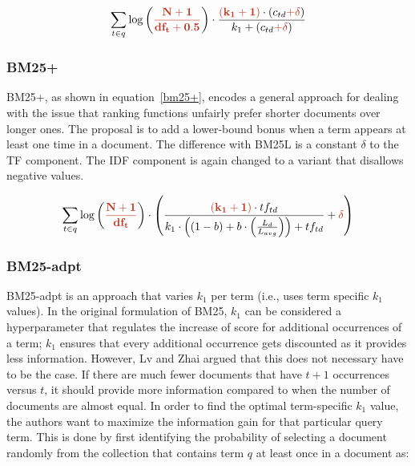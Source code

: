 \begin{equation}
	\label{bm25l}
	\sum_{t\in q} \log\left(\mathbf{\begingroup\color{ruhuisstijlrood}\frac{N+1}{df_t + 0.5}\endgroup}\right)\cdot\frac{\mathbf{\begingroup\color{ruhuisstijlrood}(k_1 + 1)\endgroup}\cdot(c_{td} \mathbf{\begingroup\color{ruhuisstijlrood}+ \delta\endgroup})}{k_1 + (c_{td} \mathbf{\begingroup\color{ruhuisstijlrood}+ \delta\endgroup})}
\end{equation}

\subsubsection{BM25+~\cite{bm25+}}
BM25+, as shown in equation~\ref{bm25+}, encodes a general approach for dealing with the issue that ranking functions unfairly prefer shorter documents over longer ones. The proposal is to add a lower-bound bonus when a term appears at least one time in a document. The difference with BM25L is a constant $\delta$ to the TF component. The IDF component is again changed to a variant that disallows negative values.

\begin{equation}
	\label{bm25+}
	\sum_{t\in q} \log\left(\mathbf{\begingroup\color{ruhuisstijlrood}\frac{N+1}{df_t}\endgroup}\right)\cdot\left(\frac{\mathbf{\begingroup\color{ruhuisstijlrood}\left(k_1 + 1\right)\endgroup}\cdot tf_{td}}{k_1\cdot\left(\left(1-b\right)+b\cdot\left(\frac{L_d}{L_{avg}}\right)\right)+tf_{td}}+\mathbf{\begingroup\color{ruhuisstijlrood}\delta\endgroup}\right)
\end{equation}

\subsubsection{BM25-adpt~\cite{bm25-adpt}}
BM25-adpt is an approach that varies $k_1$ per term (i.e., uses term specific $k_1$ values). In the original formulation of BM25, $k_1$ can be considered a hyperparameter that regulates the increase of score for additional occurrences of a term; $k_1$ ensures that every additional occurrence gets discounted as it provides less information. However, Lv and Zhai argued that this does not necessary have to be the case. If there are much fewer documents that have $t+1$ occurrences versus $t$, it should provide more information compared to when the number of documents are almost equal. In order to find the optimal term-specific $k_1$ value, the authors want to maximize the information gain for that particular query term. 
This is done by first identifying the probability of selecting a document randomly from the collection that contains term $q$ at least once in a document as:


